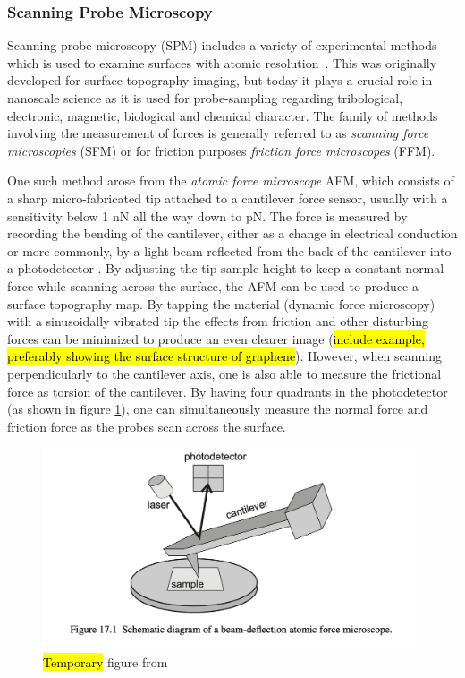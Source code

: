 \subsubsection{Scanning Probe Microscopy}\label{sec:SPM} Scanning probe
microscopy (\acrshort{SPM}) includes a variety of experimental methods which is
used to examine surfaces with atomic resolution~\cite[pp.
6-27]{BHUSHAN20051507}. This was originally developed for surface topography
imaging, but today it plays a crucial role in nanoscale science as it is used
for probe-sampling regarding tribological, electronic, magnetic, biological and
chemical character. The family of methods involving the measurement of forces is
generally referred to as \textit{scanning force microscopies} (\acrshort{SFM})
or for friction purposes \textit{friction force microscopes} (\acrshort{FFM}).

One such method arose from the \textit{atomic force microscope} \acrshort{AFM}, which consists of a sharp micro-fabricated tip attached to a cantilever force sensor, usually with a sensitivity below 1 nN all the way down to pN. The force is measured by recording the bending of
the cantilever, either as a change in electrical conduction or more commonly, by
a light beam reflected from the back of the cantilever into a photodetector
\cite[p. 183]{gnecco_meyer_2015}. By adjusting the tip-sample height to keep a constant normal force while scanning across the surface, the \acrshort{AFM} can be used to produce a
surface topography map. By tapping the material (dynamic force microscopy) with
a sinusoidally vibrated tip the effects from friction and other disturbing forces
can be minimized to produce an even clearer image (\hl{include example,
preferably showing the surface structure of graphene}). However, when scanning
perpendicularly to the cantilever axis, one is also able to measure the
frictional force as torsion of the cantilever. By having four quadrants in the
photodetector (as shown in figure \cref{fig:AFM}), one can simultaneously
measure the normal force and friction force as the probes scan across the
surface. 

\begin{figure}[H]
  \centering
  \includegraphics[width=0.6\linewidth]{figures/theory/AFM.png}
  \caption{\hl{Temporary} figure from~\cite[p. 184]{gnecco_meyer_2015}}
  \label{fig:AFM}
\end{figure}


